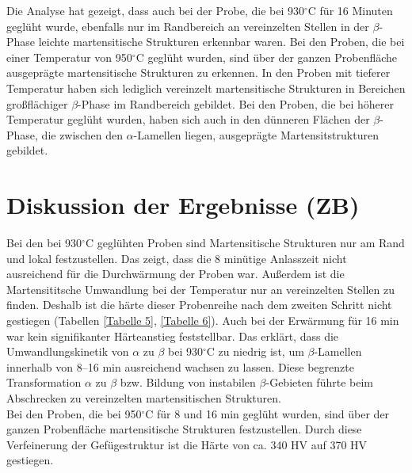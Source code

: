 Die Analyse hat gezeigt, dass auch bei der Probe, die bei 930$^\circ$C für 16 Minuten geglüht wurde, ebenfalls nur im Randbereich an vereinzelten Stellen in der $\beta$-Phase leichte martensitische Strukturen erkennbar waren.
Bei den Proben, die bei einer Temperatur von 950$^\circ$C geglüht wurden, sind über der ganzen Probenfläche ausgeprägte martensitische Strukturen zu erkennen. In den Proben mit tieferer Temperatur haben sich lediglich vereinzelt martensitische Strukturen in Bereichen großflächiger $\beta$-Phase im Randbereich gebildet. Bei den Proben, die bei höherer Temperatur geglüht wurden, haben sich auch in den dünneren Flächen der $\beta$-Phase, die zwischen den $\alpha$-Lamellen liegen, ausgeprägte Martensitstrukturen gebildet.


\section{Diskussion der Ergebnisse (ZB)}

Bei den bei 930$^\circ$C geglühten Proben sind Martensitische Strukturen nur  am Rand und lokal festzustellen. Das zeigt, dass die 8 minütige Anlasszeit nicht ausreichend für die Durchwärmung der Proben war.
Außerdem ist die Martensititsche Umwandlung bei der Temperatur  nur an vereinzelten  Stellen zu finden. Deshalb ist die härte dieser Probenreihe nach dem zweiten Schritt nicht gestiegen (Tabellen \ref{Tabelle 5}, \ref{Tabelle 6}). Auch bei der Erwärmung für 16 min war kein signifikanter Härteanstieg feststellbar. Das erklärt, dass die Umwandlungskinetik von $\alpha$ zu $\beta$ bei 930$^\circ$C zu niedrig ist, um $\beta$-Lamellen innerhalb von 8--16 min ausreichend wachsen zu lassen. Diese begrenzte Transformation $\alpha$ zu $\beta$ bzw. Bildung von instabilen $\beta$-Gebieten führte beim Abschrecken zu vereinzelten martensitischen Strukturen.\\
Bei den Proben, die bei 950$^\circ$C für 8 und 16 min geglüht wurden, sind über der ganzen Probenfläche martensitische Strukturen festzustellen. Durch diese Verfeinerung der Gefügestruktur ist die Härte von ca. 340 HV auf 370 HV gestiegen. 

